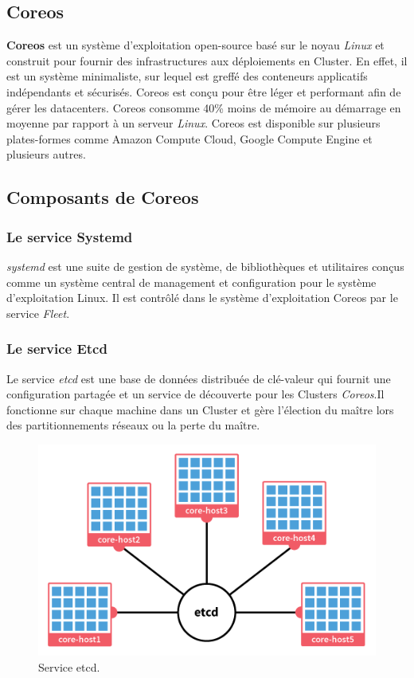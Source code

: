 \begin{onehalfspace}
\section{Coreos}
\textbf{Coreos} est un système d'exploitation open-source basé sur le noyau \emph{Linux} et construit pour fournir des infrastructures aux déploiements en Cluster. En effet, il est un système minimaliste, sur lequel est greffé des conteneurs applicatifs indépendants et sécurisés. Coreos est conçu pour être léger et performant afin de gérer les datacenters. Coreos consomme 40\% moins de mémoire au démarrage en moyenne par rapport à un serveur \emph{Linux}. Coreos est disponible sur plusieurs plates-formes comme Amazon Compute Cloud, Google Compute Engine et plusieurs autres.
\subsection{Composants de Coreos}
\subsubsection*{Le service Systemd}
\emph{systemd} est une suite de gestion de système, de bibliothèques et utilitaires conçus comme un système central de management et configuration pour le système d'exploitation Linux. Il est contrôlé dans le système d'exploitation Coreos par le service \emph{Fleet}.
\subsubsection*{Le service Etcd}
Le service \emph{etcd} est une base de données distribuée de clé-valeur qui fournit une configuration partagée et un service de découverte pour les Clusters \emph{Coreos}.Il fonctionne sur chaque machine dans un Cluster et gère l'élection du maître lors des partitionnements réseaux ou la perte du maître.
\begin{figure}[H]
\centering
\includegraphics [scale=0.4]{chapitre3/assets/etcd-cluster.png}
\caption{Service etcd.}
\end{figure}

\end{onehalfspace}

